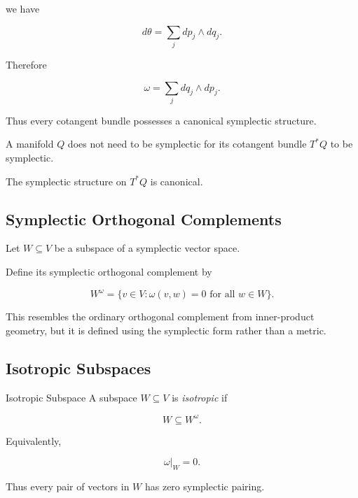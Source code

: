 we have

\[
d\theta
=
\sum_j dp_j\wedge dq_j.
\]

Therefore

\[
\boxed{
\omega
=
\sum_j dq_j\wedge dp_j.
}
\]

Thus every cotangent bundle possesses a canonical symplectic structure.

\begin{importantbox}
A manifold \(Q\) does not need to be symplectic for its cotangent bundle
\(T^*Q\) to be symplectic.

The symplectic structure on \(T^*Q\) is canonical.
\end{importantbox}

\subsection{Symplectic Orthogonal Complements}
\label{subsec:symplectic-orthogonal}

Let \(W\subseteq V\) be a subspace of a symplectic vector space.

Define its symplectic orthogonal complement by

\[
\boxed{
W^\omega
=
\{
v\in V:
\omega(v,w)=0
\text{ for all }w\in W
\}.
}
\]

This resembles the ordinary orthogonal complement from inner-product
geometry, but it is defined using the symplectic form rather than a metric.

\subsection{Isotropic Subspaces}
\label{subsec:isotropic-subspaces}

\begin{definitionbox}{Isotropic Subspace}
A subspace \(W\subseteq V\) is \emph{isotropic} if

\[
\boxed{
W\subseteq W^\omega.
}
\]
\end{definitionbox}

Equivalently,

\[
\boxed{
\omega|_W=0.
}
\]

Thus every pair of vectors in \(W\) has zero symplectic pairing.

